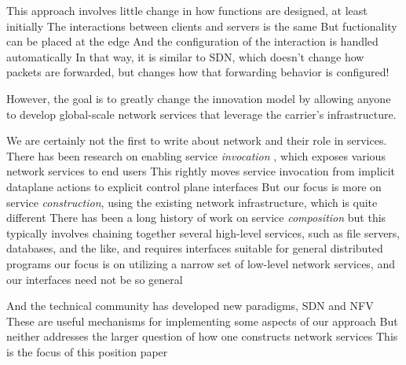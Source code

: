 \begin{outline}
{\1 This approach involves little change in how functions are designed, at least initially
    \3 The interactions between clients and servers is the same
    \3 But fuctionality can be placed at the edge
    \3 And the configuration of the interaction is handled automatically
    \3 In that way, it is similar to SDN, which doesn't change how packets are forwarded, but changes how that forwarding behavior is configured!

\1 However, the goal is to greatly change the innovation model by allowing anyone to develop global-scale network services that leverage the carrier's infrastructure.

\1 We are certainly not the first to write about network and their role in services.
    \2 There has been research on enabling service {\em invocation} \cite{netcall}, which exposes various network services to end users
        \3 This rightly moves service invocation from implicit dataplane actions to explicit control plane interfaces
        \3 But our focus is more on service {\em construction}, using the existing network infrastructure, which is quite different
    \2 There has been a long history of work on service {\em composition}
        \3 but this typically involves chaining together several high-level services, such as file servers, databases, and the like, and requires interfaces suitable for general distributed programs
        \3 our focus is on utilizing a narrow set of low-level network services, and our interfaces need not be so general

\1 And the technical community has developed new paradigms, SDN and NFV
    \2 These are useful mechanisms for implementing some aspects of our approach
    \2 But neither addresses the larger question of how one constructs network services
    \2 This is the focus of this position paper
}
\end{outline}
